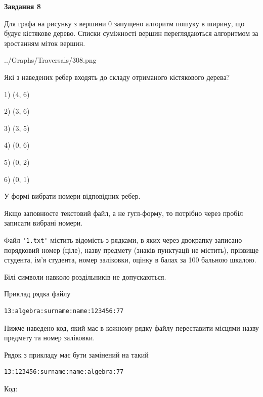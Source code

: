 \documentclass[12pt, ukrainian]{article}
\def\code#1{\Verb!#1!}
\begin{document}
{\begin {large}
{\begin {center}\textbf{Завдання 8}\end {center}}\par
Для графа на рисунку з вершини 0 запущено алгоритм пошуку в ширину, що будує кістякове дерево. Списки суміжності вершин переглядаються алгоритмом за зростанням міток вершин.\par
\begin{center}
	{../Graphs/Traversals/308.png}
\end{center}
\par Які з наведених ребер входять до складу отриманого кістякового дерева?\par
1) (4, 6)\par
2) (3, 6)\par
3) (3, 5)\par
4) (0, 6)\par
5) (0, 2)\par
6) (0, 1)\par
{\vskip 15pt} У формі вибрати номери відповідних ребер.


Якщо заповнюєте текстовий файл, а не гугл-форму, то потрібно через пробіл записа\-ти вибрані номери.\par
\newpage


Файл \code{'1.txt'} містить відомість з рядками, в яких через двокрапку записано поряд\-ковий номер (ціле), назву предмету (знаків пунктуації не містить), прізвище студента, ім'я студента, номер заліковки, оцінку в балах за 100 бальною шкалою.

Білі символи навколо роздільників не допускаються.

Приклад рядка файлу



\begin{verbatim}
13:algebra:surname:name:123456:77
\end{verbatim}


Нижче наведено код, який має в кожному рядку файлу переставити місцями назву предмету та номер заліковки.

Рядок з прикладу має бути замінений на такий



\begin{verbatim}
13:123456:surname:name:algebra:77
\end{verbatim}




Код:




\end{large}}
\end{document}
